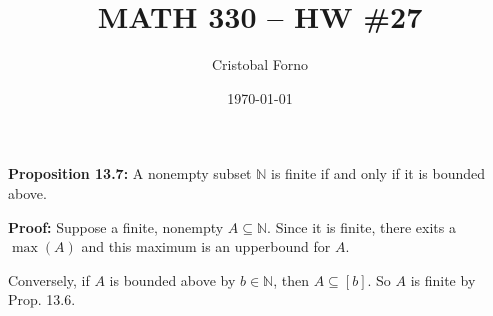 \documentclass[12pt]{article}
\title{MATH 330 -- HW \#27}
\author{Cristobal Forno}
\date{\today}
\begin{document}
\maketitle

\textbf{Proposition 13.7:} A nonempty subset $\mathbb{N}$ is finite if and only
if it is bounded above.

\textbf{Proof:}
Suppose a finite, nonempty $A \subseteq \mathbb{N}$. Since it is
finite, there exits a $\max(A)$ and this maximum is an upperbound for $A$.

Conversely, if $A$ is bounded above by $b \in \mathbb{N}$, then $A \subseteq
[b]$. So $A$ is finite by Prop. 13.6.
\end{document}
